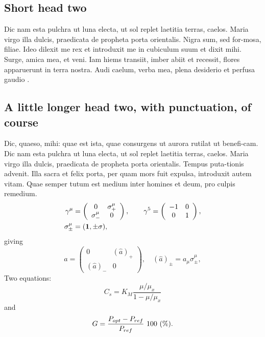 \documentclass[numbers,compress]{vmsta}
\theoremstyle{definition}
\begin{document}
\subsection{Short head two}

Dic nam esta pulchra ut luna electa, ut sol replet laetitia terras,
caelos. Maria virgo illa dulcis, praedicata de propheta porta
orientalis. Nigra sum, sed for-mosa, filiae. Ideo dilexit me rex et \cite{Anderson}
introduxit me in cubiculum suum et dixit mihi. Surge, amica mea, et
veni. Iam hiems transiit, imber abiit et recessit, flores apparuerunt in
terra nostra. Audi caelum, verba mea, plena desiderio et perfusa gaudio \cite{XiuliChao1999,powergrid1}.

\subsection{A little longer head two, with punctuation, of course}

Dic, quaeso, mihi: quae est ista, quae consurgens ut aurora rutilat
ut benefi-cam.  Dic nam esta pulchra ut luna electa, ut sol replet
laetitia terras, caelos.  Maria virgo illa dulcis, praedicata de
propheta porta orientalis. Tempus puta-tionis advenit. Illa sacra et
felix porta, per quam mors fuit expulsa, introduxit autem vitam. Quae
semper tutum est medium inter homines et deum, pro culpis remedium.
%
\begin{align}
\gamma^\mu  & =
 \left(
\begin{array}{cc}
0            & \sigma^\mu_+ \\
\sigma^\mu_- & 0
\end{array}
\right),
\qquad
\gamma^5= \left(
\begin{array}{cc}
-1 & 0 \\
0  & 1
\end{array}
\right),\nonumber \\
\sigma^\mu_{\pm}  & =    ({\bf 1} ,\pm \sigma) , \nonumber
\end{align}
giving
\begin{equation}
\hat a= \left(
\begin{array}{cc}
0          & (\hat a)_+ \\
(\hat a)_- & 0
\end{array}\right),\quad (\hat a)_\pm=a_\mu\sigma^\mu_\pm ,
\end{equation}
Two equations:
\begin{equation}
    C_{s}  =  K_{M} \frac{\mu/\mu_{x}}{1-\mu/\mu_{x}} \label{ccs}
\end{equation}
and
\begin{equation}
    G = \frac{P_{\rm opt} - P_{\rm ref}}{P_{\rm ref}} \mbox{\ }100 \mbox{\
    }(\%).
\end{equation}
\end{document}

